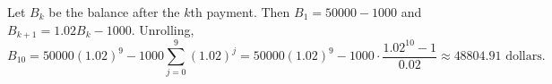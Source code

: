 Let $B_k$ be the balance after the $k$th payment. Then $B_1=50000-1000$ and $B_{k+1}=1.02B_k-1000$. Unrolling,
\[B_{10}=50000(1.02)^9-1000\sum_{j=0}^{9}(1.02)^j=50000(1.02)^9-1000\cdot\dfrac{1.02^{10}-1}{0.02}\approx\boxed{48804.91}\text{ dollars}.\]
